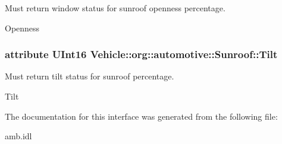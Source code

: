 Must return window status for sunroof openness percentage. 

Openness \hypertarget{interfaceVehicle_1_1org_1_1automotive_1_1Sunroof_a4113c6fe43ac0f34192346c515e0af75}{
\subsubsection[{Tilt}]{\setlength{\rightskip}{0pt plus 5cm}attribute U\-Int16 Vehicle\-::org\-::automotive\-::\-Sunroof\-::\-Tilt}}\label{interfaceVehicle_1_1org_1_1automotive_1_1Sunroof_a4113c6fe43ac0f34192346c515e0af75}


Must return tilt status for sunroof percentage. 

Tilt 

The documentation for this interface was generated from the following file\-:\begin{DoxyCompactItemize}
\item 
amb.\-idl\end{DoxyCompactItemize}
